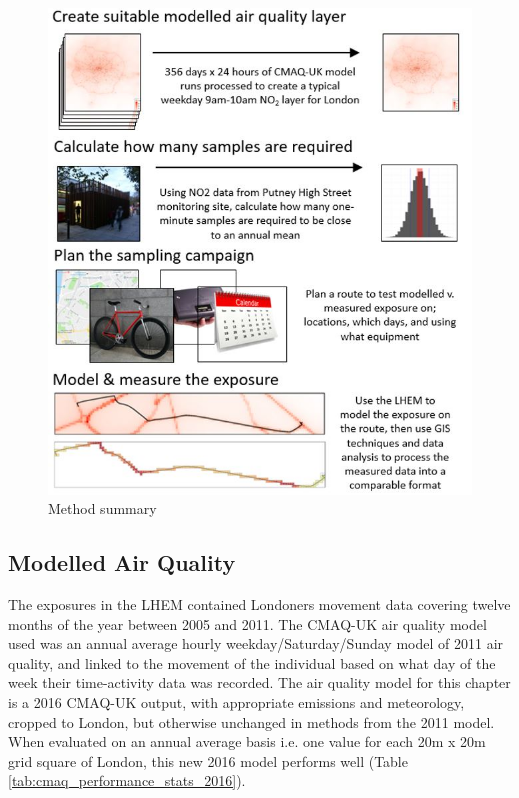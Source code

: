 \begin{figure}[H]
\centering
\includegraphics[scale=0.8]{images/comparison_method_summary.jpg}
\caption{Method summary}
\label{fig:comparison_method_summary}
\end{figure}

\subsection{Modelled Air Quality}
\label{subsec:4modelledairquality}

The exposures in the LHEM contained Londoners movement data covering twelve months of the year between 2005 and 2011. The CMAQ-UK air quality model used was an annual average hourly weekday/Saturday/Sunday model of 2011 air quality, and linked to the movement of the individual based on what day of the week their time-activity data was recorded. The air quality model for this chapter is a 2016 CMAQ-UK output, with appropriate emissions and meteorology, cropped to London, but otherwise unchanged in methods from the 2011 model. When evaluated on an annual average basis i.e. one value for each 20m x 20m grid square of London, this new 2016 model performs well (Table \ref{tab:cmaq_performance_stats_2016}).


